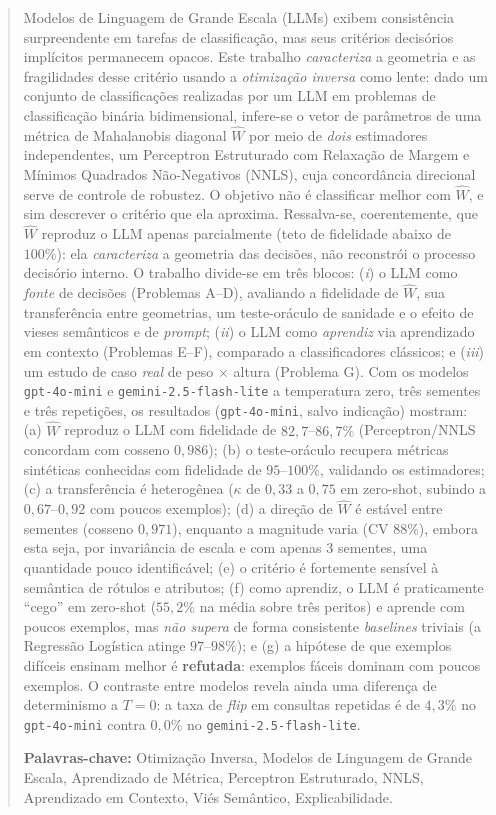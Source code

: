 \documentclass[12pt,a4paper]{article}
\newcommand{\West}{\ensuremath{\hat{W}}}   %
\begin{document}
\begin{abstract}
Modelos de Linguagem de Grande Escala (LLMs) exibem consistência surpreendente em
tarefas de classificação, mas seus critérios decisórios implícitos permanecem opacos.
Este trabalho \emph{caracteriza} a geometria e as fragilidades desse critério usando a
\emph{otimização inversa} como lente: dado um conjunto de classificações realizadas
por um LLM em problemas de classificação binária bidimensional, infere-se o vetor de
parâmetros de uma métrica de
Mahalanobis diagonal \West{} por meio de \emph{dois} estimadores independentes, um
Perceptron Estruturado com Relaxação de Margem e Mínimos Quadrados Não-Negativos (NNLS),
cuja concordância direcional serve de controle de robustez. O objetivo não é classificar
melhor com \West{}, e sim descrever o critério que ela aproxima. Ressalva-se, coerentemente,
que \West{} reproduz o LLM apenas parcialmente (teto de fidelidade abaixo de $100\%$): ela
\emph{caracteriza} a geometria das decisões, não reconstrói o processo decisório interno. O trabalho divide-se em
três blocos: (\emph{i}) o LLM como \emph{fonte} de decisões (Problemas A–D), avaliando a
fidelidade de \West{}, sua transferência entre geometrias, um teste-oráculo de sanidade e
o efeito de vieses semânticos e de \emph{prompt}; (\emph{ii}) o LLM como \emph{aprendiz}
via aprendizado em contexto (Problemas E–F), comparado a classificadores clássicos;
e (\emph{iii}) um estudo de caso \emph{real} de peso $\times$ altura (Problema G).
Com os modelos \texttt{gpt-4o-mini} e \texttt{gemini-2.5-flash-lite} a temperatura zero,
três sementes e três repetições,
os resultados (\texttt{gpt-4o-mini}, salvo indicação) mostram: (a) \West{} reproduz o LLM
com fidelidade de $82{,}7$–$86{,}7\%$
(Perceptron/NNLS concordam com cosseno $0{,}986$); (b) o teste-oráculo recupera métricas
sintéticas conhecidas com fidelidade de $95$–$100\%$, validando os estimadores; (c) a
transferência é heterogênea ($\kappa$ de $0{,}33$ a $0{,}75$ em zero-shot, subindo a
$0{,}67$–$0{,}92$ com poucos exemplos); (d) a direção de \West{} é estável entre sementes
(cosseno $0{,}971$), enquanto a magnitude varia (CV $88\%$), embora esta seja, por
invariância de escala e com apenas $3$ sementes, uma quantidade pouco identificável; (e) o
critério é fortemente sensível à semântica de rótulos e atributos; (f) como
aprendiz, o LLM é praticamente ``cego'' em zero-shot ($55{,}2\%$ na média sobre três
peritos)
e aprende com poucos exemplos, mas \emph{não supera} de forma consistente \emph{baselines}
triviais (a Regressão Logística atinge $97$–$98\%$); e (g) a hipótese de que exemplos
difíceis ensinam melhor é
\textbf{refutada}: exemplos fáceis dominam com poucos exemplos. O contraste entre modelos
revela ainda uma diferença de determinismo a $T=0$: a taxa de \emph{flip} em consultas
repetidas é de $4{,}3\%$ no \texttt{gpt-4o-mini} contra $0{,}0\%$ no
\texttt{gemini-2.5-flash-lite}.

\smallskip\noindent\textbf{Palavras-chave:}
Otimização Inversa, Modelos de Linguagem de Grande Escala, Aprendizado de Métrica,
Perceptron Estruturado, NNLS, Aprendizado em Contexto, Viés Semântico, Explicabilidade.
\end{abstract}
\end{document}
